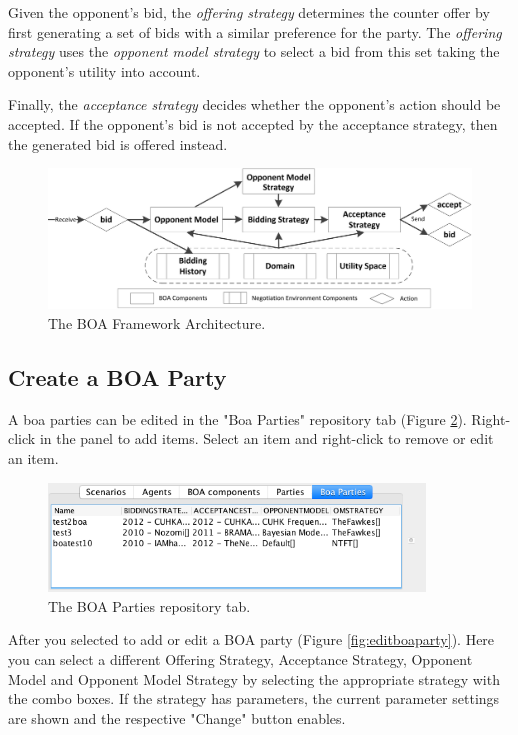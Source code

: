 \documentclass[]{article}
\begin{document}
Given the opponent's bid, the \textit{offering strategy} determines the counter offer by first generating a set of bids with a similar preference for the party. The \textit{offering strategy} uses the \textit{opponent model strategy} to select a bid from this set taking the opponent's utility into account.

Finally, the \textit{acceptance strategy} decides whether the opponent's action should be accepted. If the opponent's bid is not accepted by the acceptance strategy, then the generated bid is offered instead.

\begin{figure}[t] 
	\center
	\includegraphics[width=15.0cm]{media/BOAflow.png}
	\caption{The BOA Framework Architecture.}
	\label{fig:flowchart}
\end{figure}

\FloatBarrier

\subsection{Create a BOA Party}
A boa parties can be edited in the "Boa Parties" repository tab (Figure \ref{fig:boaparties}). Right-click in the panel to add items. Select an item and right-click to remove or edit an item.   


\begin{figure}[!ht] 
	\center
	\includegraphics[width=10.0cm]{media/boacomponants.png}
	\caption{The BOA Parties repository tab.}
	\label{fig:boaparties}
\end{figure}


After you selected to add or edit a BOA party (Figure \ref{fig:editboaparty}).  Here you can select a different Offering Strategy, Acceptance Strategy, Opponent Model and Opponent Model Strategy by selecting the appropriate strategy with the combo boxes. If the strategy has parameters, the current parameter settings are shown and the respective "Change" button enables.
\end{document}
